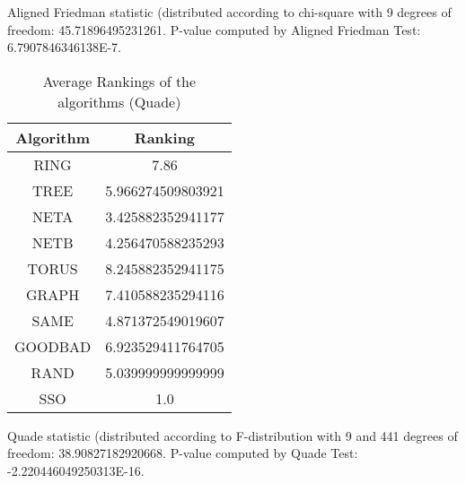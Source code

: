 \documentclass[a4paper,10pt]{article}
\begin{document}
\begin{landscape}
Aligned Friedman statistic (distributed according to chi-square with 9 degrees of freedom: 45.71896495231261. 
P-value computed by Aligned Friedman Test: 6.7907846346138E-7.\newline


\newpage

\begin{table}[!htp]
\centering
\caption{Average Rankings of the algorithms (Quade)
}\begin{tabular}{c|c}
Algorithm&Ranking\\
\hline
 RING&7.86\\
 TREE&5.966274509803921\\
 NETA&3.425882352941177\\
 NETB&4.256470588235293\\
 TORUS&8.245882352941175\\
 GRAPH&7.410588235294116\\
 SAME&4.871372549019607\\
 GOODBAD&6.923529411764705\\
 RAND&5.039999999999999\\
 SSO&1.0\\
\end{tabular}
\end{table}
Quade statistic (distributed according to F-distribution with 9 and 441 degrees of freedom: 38.90827182920668. 
P-value computed by Quade Test: -2.220446049250313E-16.\newline


\newpage


\end{landscape}
\end{document}
